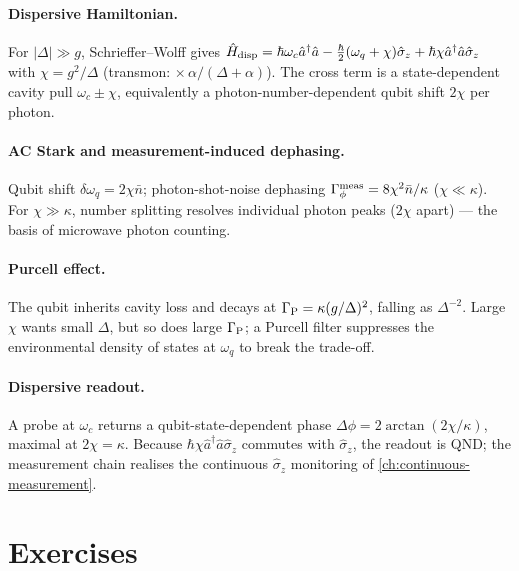 \clearpage
\begin{chaptersummary}

\paragraph{Dispersive Hamiltonian.}
For $|\Delta|\gg g$, Schrieffer--Wolff gives
$\hat{H}_{\rm disp}=\hbar\omega_c\hat a^\dagger\hat a-\tfrac\hbar2(\omega_q+\chi)\hat\sigma_z+\hbar\chi\hat a^\dagger\hat a\hat\sigma_z$
with $\chi=g^2/\Delta$ (transmon: $\times\,\alpha/(\Delta+\alpha)$).
The cross term is a state-dependent cavity pull $\omega_c\pm\chi$,
equivalently a photon-number-dependent qubit shift $2\chi$ per
photon.

\paragraph{AC Stark and measurement-induced dephasing.}
Qubit shift $\delta\omega_q=2\chi\bar n$; photon-shot-noise
dephasing $\Gamma_\phi^{\rm meas}=8\chi^2\bar n/\kappa$ ($\chi\ll\kappa$).
For $\chi\gg\kappa$, number splitting resolves individual photon
peaks ($2\chi$ apart) --- the basis of microwave photon counting.

\paragraph{Purcell effect.}
The qubit inherits cavity loss and decays at
$\Gamma_{\rm P}=\kappa(g/\Delta)^2$, falling as $\Delta^{-2}$. Large
$\chi$ wants small $\Delta$, but so does large $\Gamma_{\rm P}$; a
Purcell filter suppresses the environmental density of states at
$\omega_q$ to break the trade-off.

\paragraph{Dispersive readout.}
A probe at $\omega_c$ returns a qubit-state-dependent phase
$\Delta\phi=2\arctan(2\chi/\kappa)$, maximal at $2\chi=\kappa$.
Because $\hbar\chi\hat a^\dagger\hat a\hat\sigma_z$ commutes with
$\hat\sigma_z$, the readout is QND; the measurement chain realises
the continuous $\hat\sigma_z$ monitoring of
\cref{ch:continuous-measurement}.

\end{chaptersummary}

\section*{Exercises}

